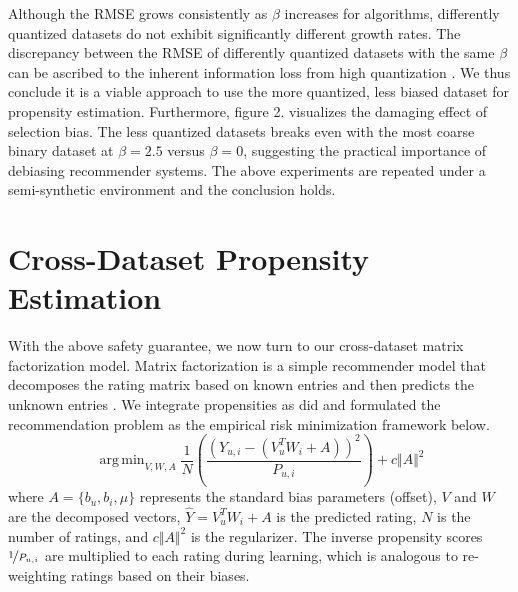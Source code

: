 \documentclass{article}
\DeclareMathOperator*{\argmin}{arg\,min}
\begin{document}
Although the RMSE grows consistently as $\beta$ increases for algorithms, differently quantized datasets do not exhibit significantly different growth rates. The discrepancy between the RMSE of differently quantized datasets with the same $\beta$ can be ascribed to the inherent information loss from high quantization \cite{widrow1996statistical}. We thus conclude it is a viable approach to use the more quantized, less biased dataset for propensity estimation. Furthermore, figure 2. visualizes the damaging effect of selection bias. The less quantized datasets breaks even with the most coarse binary dataset at $\beta=2.5$ versus $\beta=0$, suggesting the practical importance of debiasing recommender systems. The above experiments are repeated under a semi-synthetic environment and the conclusion holds.


\section{Cross-Dataset Propensity Estimation}
With the above safety guarantee, we now turn to our cross-dataset matrix factorization model. Matrix factorization is a simple recommender model that decomposes the rating matrix based on known entries and then predicts the unknown entries \cite{koren2009matrix}. We integrate propensities as \cite{schnabel2016recommendations} did and formulated the recommendation problem as the empirical risk minimization framework below. 
\begin{equation} \argmin_{V,W,A} \frac{1}{N}\left(\frac{(Y_{u,i}- (V_u^TW_i + A))^2}{P_{u,i}} \right) + c \Vert A \Vert^2
\end{equation}
where $A = \{ b_u, b_i, \mu \}$ represents the standard bias parameters (offset), $V$ and $W$ are the decomposed vectors, $\hat{Y} = V_u^TW_i + A$ is the predicted rating, $N$ is the number of ratings, and $c \Vert A \Vert^2$ is the regularizer. The inverse propensity scores $\nicefrac{1}{P_{u,i}}$ are multiplied to each rating during learning, which is analogous to re-weighting ratings based on their biases.
\end{document}
